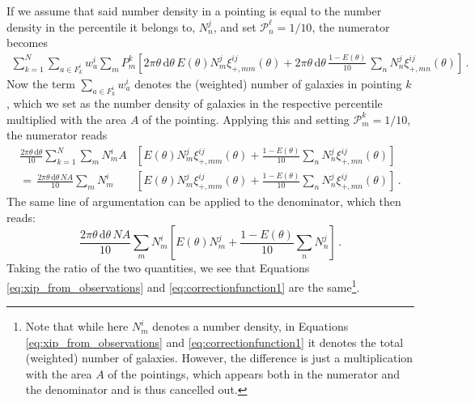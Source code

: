 \documentclass[referee]{aa} %
\renewcommand{\[}{\begin{equation}}
\renewcommand{\]}{\end{equation}}
\renewcommand{\rm}{\mathrm}
\def\d{\rm{d}}
\begin{document}
\begin{appendix}
If we assume that said number density in a pointing is equal to the number density in the percentile it belongs to, $N_n^j$, and set $\mathcal{P}_n^\ell=1/10$, the numerator becomes \begin{align}
\sum_{k=1}^N \sum_{a\in F_k^i} w_a^i \sum_m P^k_m \left[2\pi\theta\,\d\theta\,E(\theta) N_m^j \xi_{+,mm}^{ij}(\theta) + 2\pi\theta\,\d\theta\,\frac{1-E(\theta)}{10}\, \sum_n N_n^j \xi_{+,mn}^{ij}(\theta) \right] \, .
\end{align}
Now the term $\sum_{a\in F_k^i} w_a^i$ denotes the (weighted) number of galaxies in pointing $k$, which we set as the number density of galaxies in the respective percentile multiplied with the area $A$ of the pointing. Applying this and setting $\mathcal{P}_m^k=1/10$, the numerator reads 
\begin{align}
\frac{2\pi\theta\,\d\theta}{10} \sum_{k=1}^N \sum_m N_m^i A &\left[ E(\theta) N_m^j \xi_{+,mm}^{ij}(\theta) + \frac{1-E(\theta)}{10}\sum_n N_n^j\xi_{+,mn}^{ij}(\theta)\right] \nonumber\\
 =  \, \frac{2\pi\theta\,\d\theta \, NA}{10}  \sum_m N_m^i &\left[ E(\theta) N_m^j \xi_{+,mm}^{ij}(\theta) + \frac{1-E(\theta)}{10}\sum_n N_n^j\xi_{+,mn}^{ij}(\theta)\right] \, .
\end{align}
%
 The same line of argumentation can be applied to the denominator, which then reads: \[
\frac{2\pi\theta\,\d\theta \, NA}{10}  \sum_m N_m^i \left[ E(\theta) N_m^j + \frac{1-E(\theta)}{10}\sum_n N_n^j\right]\, .
 \]
Taking the ratio of the two quantities, we see that Equations \eqref{eq:xip_from_observations} and \eqref{eq:correctionfunction1} are the same\footnote{Note that while here $N_m^i$ denotes a number density, in Equations \eqref{eq:xip_from_observations} and \eqref{eq:correctionfunction1} it denotes the total (weighted) number of galaxies. However, the difference is just a multiplication with the area $A$ of the pointings, which appears both in the numerator and the denominator and is thus cancelled out.}.

\end{appendix}
\end{document}
